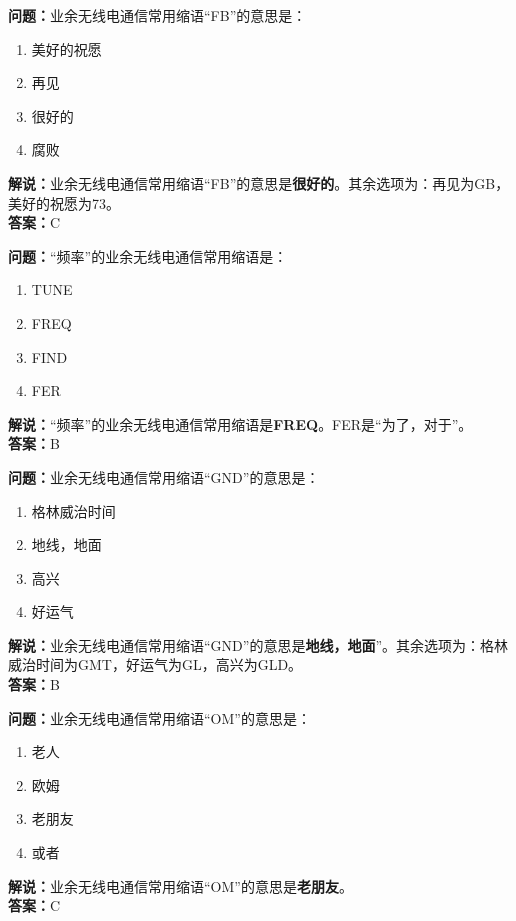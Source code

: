 \bigskip


\noindent\textbf{问题：}业余无线电通信常用缩语“FB”的意思是：
\begin{enumerate}[label=\Alph*), leftmargin=3em]
\item 美好的祝愿
\item 再见
\item 很好的
\item 腐败
\end{enumerate}
\noindent\textbf{解说：}业余无线电通信常用缩语“FB”的意思是\textbf{很好的}。其余选项为：再见为GB，美好的祝愿为73。\\\noindent\textbf{答案：}C

\bigskip


\noindent\textbf{问题：}“频率”的业余无线电通信常用缩语是：
\begin{enumerate}[label=\Alph*), leftmargin=3em]
\item TUNE
\item FREQ
\item FIND
\item FER
\end{enumerate}
\noindent\textbf{解说：}“频率”的业余无线电通信常用缩语是\textbf{FREQ}。FER是“为了，对于”。\\\noindent\textbf{答案：}B

\bigskip


\noindent\textbf{问题：}业余无线电通信常用缩语“GND”的意思是：
\begin{enumerate}[label=\Alph*), leftmargin=3em]
\item 格林威治时间
\item 地线，地面
\item 高兴
\item 好运气
\end{enumerate}
\noindent\textbf{解说：}业余无线电通信常用缩语“GND”的意思是\textbf{地线，地面}”。其余选项为：格林威治时间为GMT，好运气为GL，高兴为GLD。\\\noindent\textbf{答案：}B

\bigskip


\noindent\textbf{问题：}业余无线电通信常用缩语“OM”的意思是：
\begin{enumerate}[label=\Alph*), leftmargin=3em]
\item 老人
\item 欧姆
\item 老朋友
\item 或者
\end{enumerate}
\noindent\textbf{解说：}业余无线电通信常用缩语“OM”的意思是\textbf{老朋友}。\\\noindent\textbf{答案：}C

